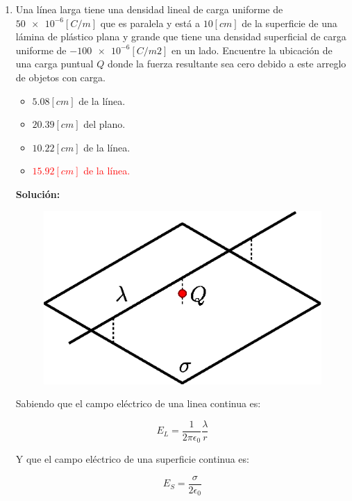 \documentclass[letter,11pt]{article}
\begin{document}
\begin{enumerate}
\item Una línea larga tiene una densidad lineal de carga uniforme de
$\num{50e-6}[C/m]$ que es paralela y está a $10 [cm]$ de la superficie de una
lámina de plástico plana y grande que tiene una densidad superficial de carga
uniforme de $\num{-100e-6}[C/m2]$ en un lado. Encuentre la ubicación de una
carga puntual $Q$ donde la fuerza resultante sea cero debido a este arreglo de
objetos con carga.

\begin{itemize}
    \item $ 5.08 [cm]$ de la línea.
    \item $20.39 [cm]$ del plano.
    \item $10.22 [cm]$ de la línea.
    \item \textcolor{red}{$15.92 [cm]$ de la línea.}
\end{itemize}

\textbf{Solución:}

\begin{figure}[!h]
\centering
\includegraphics[scale=0.42]{resources/a4.eps}
\end{figure}

Sabiendo que el campo eléctrico de una linea continua es:

\begin{equation*}
    E_L = \frac{1}{2\pi\epsilon_0}\frac{\lambda}{r}
\end{equation*}

Y que el campo eléctrico de una superficie continua es:

\begin{equation*}
    E_S = \frac{\sigma}{2\epsilon_0}
\end{equation*}


\end{enumerate}
\end{document}
